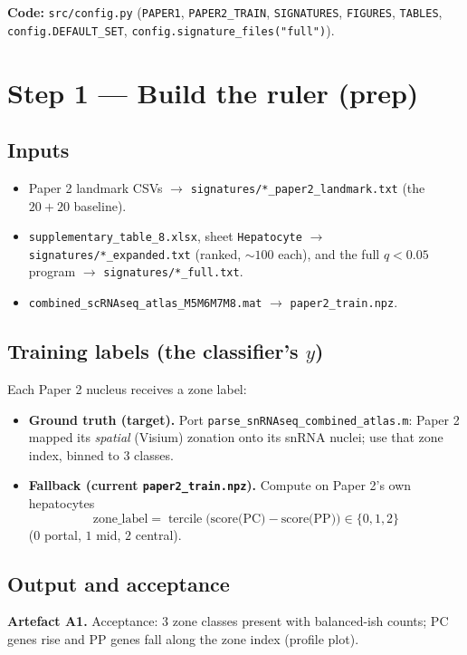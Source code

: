 \documentclass[11pt]{article}
\newcommand{\code}[1]{\texttt{\small #1}}
\begin{document}
\noindent\textbf{Code:} \code{src/config.py}
(\code{PAPER1}, \code{PAPER2\_TRAIN}, \code{SIGNATURES}, \code{FIGURES}, \code{TABLES},
\code{config.DEFAULT\_SET}, \code{config.signature\_files("full")}).

\section{Step 1 --- Build the ruler (prep)}

\subsection{Inputs}
\begin{itemize}[leftmargin=1.4em]
  \item Paper 2 landmark CSVs $\rightarrow$ \code{signatures/*\_paper2\_landmark.txt}
        (the $20{+}20$ baseline).
  \item \code{supplementary\_table\_8.xlsx}, sheet \code{Hepatocyte} $\rightarrow$
        \code{signatures/*\_expanded.txt} (ranked, $\sim\!100$ each), and the full
        $q<0.05$ program $\rightarrow$ \code{signatures/*\_full.txt}.
  \item \code{combined\_scRNAseq\_atlas\_M5M6M7M8.mat} $\rightarrow$ \code{paper2\_train.npz}.
\end{itemize}

\subsection{Training labels (the classifier's $y$)}
Each Paper 2 nucleus receives a zone label:
\begin{itemize}[leftmargin=1.4em]
  \item \textbf{Ground truth (target).} Port \code{parse\_snRNAseq\_combined\_atlas.m}: Paper 2
        mapped its \emph{spatial} (Visium) zonation onto its snRNA nuclei; use that zone index,
        binned to $3$ classes.
  \item \textbf{Fallback (current \code{paper2\_train.npz}).} Compute on Paper 2's own
        hepatocytes
        \[
          \text{zone\_label} = \operatorname{tercile}\!\big(\text{score(PC)} - \text{score(PP)}\big)
          \in \{0,1,2\}
        \]
        ($0$ portal, $1$ mid, $2$ central).
\end{itemize}

\subsection{Output and acceptance}
\textbf{Artefact A1.} Acceptance: $3$ zone classes present with balanced-ish counts; PC genes
rise and PP genes fall along the zone index (profile plot).
\end{document}
